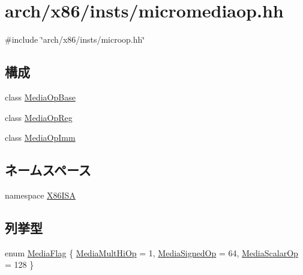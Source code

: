 \hypertarget{micromediaop_8hh}{
\section{arch/x86/insts/micromediaop.hh}
\label{micromediaop_8hh}
}
{\ttfamily \#include \char`\"{}arch/x86/insts/microop.hh\char`\"{}}\par
\subsection*{構成}
\begin{DoxyCompactItemize}
\item 
class \hyperlink{classX86ISA_1_1MediaOpBase}{MediaOpBase}
\item 
class \hyperlink{classX86ISA_1_1MediaOpReg}{MediaOpReg}
\item 
class \hyperlink{classX86ISA_1_1MediaOpImm}{MediaOpImm}
\end{DoxyCompactItemize}
\subsection*{ネームスペース}
\begin{DoxyCompactItemize}
\item 
namespace \hyperlink{namespaceX86ISA}{X86ISA}
\end{DoxyCompactItemize}
\subsection*{列挙型}
\begin{DoxyCompactItemize}
\item 
enum \hyperlink{namespaceX86ISA_a8983ba7d9e44eff3c164c601a45806b7}{MediaFlag} \{ \hyperlink{namespaceX86ISA_a8983ba7d9e44eff3c164c601a45806b7a2c2544f5ea45ac872d508577e2774bf5}{MediaMultHiOp} =  1, 
\hyperlink{namespaceX86ISA_a8983ba7d9e44eff3c164c601a45806b7a19421dd7b33eaa5ff6cacc798b11538b}{MediaSignedOp} =  64, 
\hyperlink{namespaceX86ISA_a8983ba7d9e44eff3c164c601a45806b7ac4f7a3c2b0fb1ed211c8c31b5a56900e}{MediaScalarOp} =  128
 \}
\end{DoxyCompactItemize}
